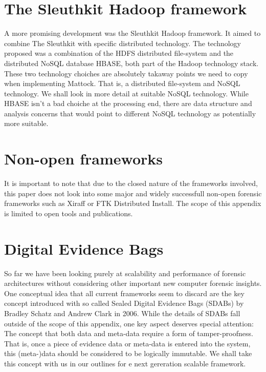 \section{The Sleuthkit Hadoop framework}
A more promising development was the Sleuthkit Hadoop framework. It aimed to combine The Sleuthkit with specific distributed technology. The technology proposed was a combination of the HDFS distributed file-system and the distributed NoSQL database HBASE, both part of the Hadoop technology stack. These two technology choiches are absolutely takaway points we need to copy when implementing Mattock. That is, a distributed file-system and NoSQL technology. We shall look in more detail at suitable NoSQL technology. While HBASE isn't a bad choiche at the processing end, there are data structure and analysis concerns that would point to different NoSQL technology as potentially more suitable. 
\section{Non-open frameworks}
It is important to note that due to the closed nature of the frameworks involved, this paper does not look into some major and widely successfull non-open forensic frameworks such as Xiraff or FTK Distributed Install. The scope of this appendix is limited to open tools and publications.
\section{Digital Evidence Bags}
So far we have been looking purely at scalability and performance of forensic architectures without considering other important new computer forensic insights. One conceptual idea that all current frameworks seem to discard are the key concept introduced with so called Sealed Digital Evidence Bags (SDABs) by Bradley Schatz and Andrew Clark in 2006. While the details of SDABs fall outside of the scope of this appendix, one key aspect deserves special attention: The concept that both data and meta-data require a form of tamper-proofness. That is, once a piece of evidence data or meta-data is entered into the system, this (meta-)data should be considered to be logically immutable. We shall take this concept with us in our outlines for e next gereration scalable framework.
